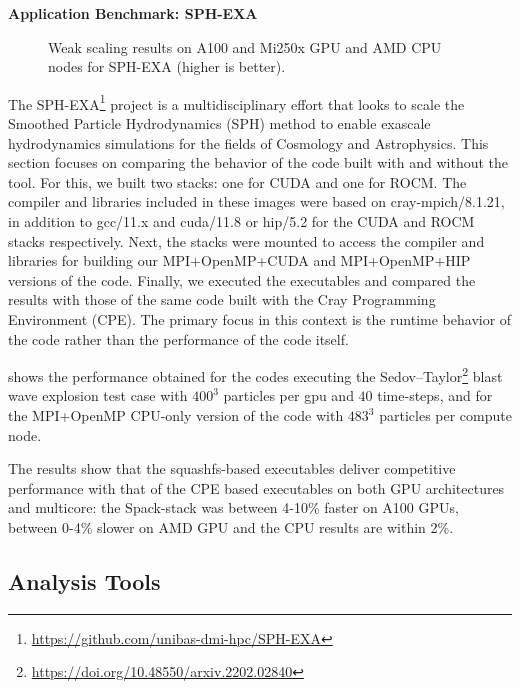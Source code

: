 \noindent\textbf{Application Benchmark: SPH-EXA}

\begin{figure}[htp!]
    \begin{center}
        
        
        
    \end{center}
    \caption{Weak scaling results on A100 and Mi250x GPU and AMD CPU nodes for SPH-EXA (higher is better).}
    \label{fig:sph-weak}
\end{figure}

The SPH-EXA\footnote{\url{https://github.com/unibas-dmi-hpc/SPH-EXA}} project is a multidisciplinary effort that looks to scale the Smoothed Particle Hydrodynamics (SPH) method to enable exascale hydrodynamics simulations for the fields of Cosmology and Astrophysics. 
This section focuses on comparing the behavior of the code built with and without the \stackinator tool.
For this, we built two \stackinator stacks: one for CUDA and one for ROCM.
The compiler and libraries included in these images were based on cray-mpich/8.1.21, in addition to gcc/11.x and cuda/11.8 or hip/5.2 for the CUDA and ROCM stacks respectively.
Next, the stacks were mounted to access the compiler and libraries for building our MPI+OpenMP+CUDA and MPI+OpenMP+HIP versions of the code.
Finally, we executed the executables and compared the results with those of the same code built with the Cray Programming Environment (CPE).
The primary focus in this context is the runtime behavior of the code rather than the performance of the code itself.

 shows the performance obtained for the codes executing the Sedov--Taylor\footnote{\url{https://doi.org/10.48550/arxiv.2202.02840}} blast wave explosion test case with $400^3$ particles per gpu and $40$ time-steps, and for the MPI+OpenMP CPU-only version of the code with $483^3$ particles per compute node.

The results show that the squashfs-based executables deliver competitive performance with that of the CPE based executables on both GPU architectures and multicore: the Spack-stack was between 4-10\% faster on A100 GPUs, between 0-4\% slower on AMD GPU and the CPU results are within 2\%.

\subsection{Analysis Tools}

